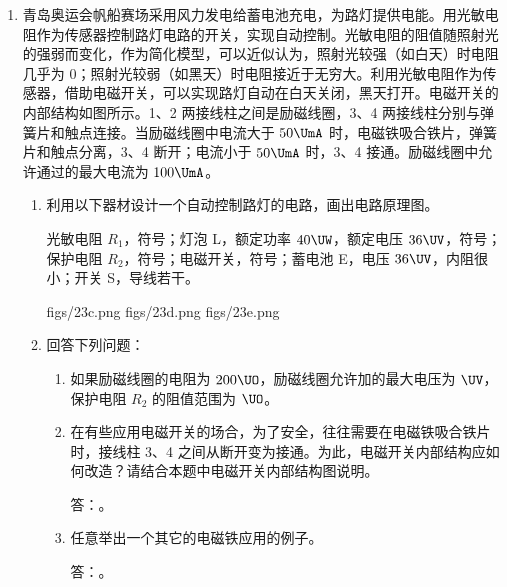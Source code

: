\documentclass[\gkver]{gaokaozhenti}
\begin{document}
\begin{enumerate}
\item
青岛奥运会帆船赛场采用风力发电给蓄电池充电，为路灯提供电能。用光敏电阻作为传感器控制路灯电路的开关，实现自动控制。光敏电阻的阻值随照射光的强弱而变化，作为简化模型，可以近似认为，照射光较强（如白天）时电阻几乎为 0；照射光较弱（如黑天）时电阻接近于无穷大。利用光敏电阻作为传感器，借助电磁开关，可以实现路灯自动在白天关闭，黑天打开。电磁开关的内部结构如图所示。1、2 两接线柱之间是励磁线圈，3、4 两接线柱分别与弹簧片和触点连接。当励磁线圈中电流大于 $50\UmA$ 时，电磁铁吸合铁片，弹簧片和触点分离，3、4 断开；电流小于 $50\UmA$ 时，3、4 接通。励磁线圈中允许通过的最大电流为 $100\UmA$。


\begin{enumerate}
	\item
	利用以下器材设计一个自动控制路灯的电路，画出电路原理图。

	光敏电阻 $R_{1}$，符号；灯泡 L，额定功率 $40\UW$，额定电压 $36\UV$，符号；保护电阻 $R_{2}$，符号；电磁开关，符号；蓄电池 E，电压 $36\UV$，内阻很小；开关 S，导线若干。

	{figs/23c.png}
	{figs/23d.png}
	{figs/23e.png}

	\item
	回答下列问题：

	\begin{enumerate}
		\item
		如果励磁线圈的电阻为 $200\UO$，励磁线圈允许加的最大电压为 \tkanswer[1.2cm]{} $\UV$，保护电阻 $R_{2}$ 的阻值范围为 \tkanswer[2cm]{} $\UO$。

		\item
		在有些应用电磁开关的场合，为了安全，往往需要在电磁铁吸合铁片时，接线柱 3、4 之间从断开变为接通。为此，电磁开关内部结构应如何改造？请结合本题中电磁开关内部结构图说明。

		答：\tkanswer[6cm]{}。

		\item
		任意举出一个其它的电磁铁应用的例子。

		答：\tkanswer[4cm]{}。
	\end{enumerate}
\end{enumerate}

\end{enumerate}
\end{document}

